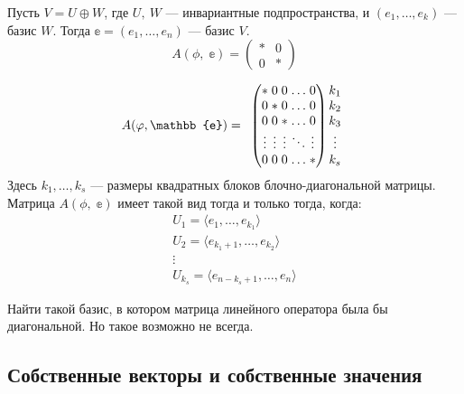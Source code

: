 \begin{Generalization}
    Пусть $V = U \oplus W$, где $U,\ W$ --- инвариантные подпространства, и $(e_1, \ldots, e_k)$ --- базис $W$. Тогда $\mathbb{e} = (e_1, \dots, e_n)$ --- базис $V$.
    \[  
        A(\phi,\; \mathbb{e}) = \begin{pmatrix}
            *& 0 \\
            0& *
        \end{pmatrix}
    \]
\end{Generalization}

\begin{Generalization}
  \[
  A(\phi, \mathbb{e}) = 
  \begin{array}{cc}
  \arraycolsep=1.4pt
  \begin{pmatrix}
  * &0 &0 &\ldots &0\\
  0 &* &0 &\ldots &0 \\
  0 &0 &* &\ldots &0 \\
  \vdots &\vdots &\vdots &\ddots &\vdots\\
  0 &0 &0 &\ldots &*
  \end{pmatrix}
  \begin{matrix}
  k_1 \\ k_2 \\ k_3 \\ \vdots \\ k_s
  \end{matrix}
  \end{array}\]
  Здесь $k_1, \ldots, k_s$ --- размеры квадратных блоков блочно-диагональной матрицы. Матрица $A(\phi,\; \mathbb{e})$ имеет такой вид тогда и только тогда, когда:
  \begin{gather*}
      U_1 = \langle e_1, \ldots, e_{k_1}\rangle \\
      U_2 = \langle e_{k_1+1}, \ldots, e_{k_2} \rangle \\
      \vdots\\
      U_{k_s} = \langle e_{n-k_s+1}, \ldots, e_n \rangle
  \end{gather*}
\end{Generalization}

\begin{Thedream}
    Найти такой базис, в котором матрица линейного оператора была бы диагональной. Но такое возможно не всегда.
\end{Thedream}

\subsection*{Собственные векторы и собственные значения}

